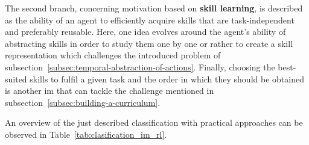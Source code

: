 \documentclass[draft,final]{vutinfth} %
\begin{document}
    The second branch, concerning motivation based on \textbf{skill learning}, is described as the ability of an agent to efficiently acquire skills that are task-independent and preferably reusable.
    Here, one idea evolves around the agent's ability of abstracting skills in order to study them one by one or rather to create a skill representation which challenges the introduced problem of subsection~\ref{subsec:temporal-abstraction-of-actions}.
    Finally, choosing the best-suited skills to fulfil a given task and the order in which they should be obtained is another \gls{im} that can tackle the challenge mentioned in subsection~\ref{subsec:building-a-curriculum}.

    An overview of the just described classification with practical approaches can be observed in Table~\ref{tab:clasification_im_rl}.
\end{document}
